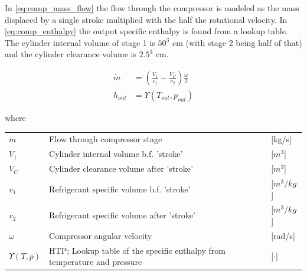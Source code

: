 In \cref{eq:comp_mass_flow} the flow through the compressor is modeled as the mass displaced by a single stroke multiplied with the half the rotational velocity.
In \cref{eq:comp_enthalpy} the output specific enthalpy is found from a lookup table. The cylinder internal volume of stage 1 is $50^3$ cm (with stage 2 being half of that) and the cylinder clearance volume is $2.5^3$ cm.

\begin{align}
	\dot{m} &= \left(\frac{V_1}{v_1} - \frac{V_C}{v_2}\right) \frac{\omega}{2} \label{eq:comp_mass_flow} \\
	h_{out} &= \Upsilon(T_{out}, p_{out}) \label{eq:comp_enthalpy}
\end{align}

where

\begin{center}
	\begin{tabular}{l p{10cm} l}
		$\dot{m}$       & Flow through compressor stage                                   & [\si{kg}/\si{s}]     \\
		$V_1$           & Cylinder internal volume b.f. 'stroke'                          & [$\si{m}^3$]         \\
		$V_C$           & Cylinder clearance volume after 'stroke'                        & [$\si{m}^3$]         \\
		$v_1$           & Refrigerant specific volume b.f. 'stroke'                       & [$\si{m}^3/\si{kg}$] \\
		$v_2$           & Refrigerant specific volume after 'stroke'                      & [$\si{m}^3/\si{kg}$] \\
		$\omega$        & Compressor angular velocity                                     & [\si{rad}/\si{s}]    \\
		$\Upsilon(T,p)$ & HTP; Lookup table of the specific enthalpy from temperature and pressure & [$\cdot$]            \\
	\end{tabular}
\end{center}

